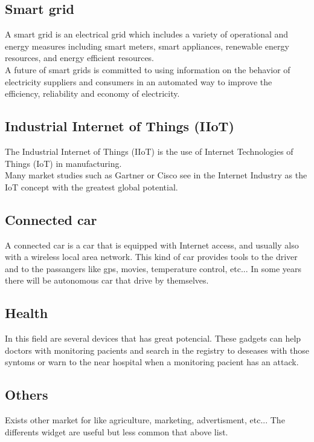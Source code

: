 \subsection{Smart grid} A smart grid is an electrical grid which includes a variety of operational and energy measures including smart meters, smart appliances, renewable energy resources, and energy efficient resources.\\
A future of smart grids is committed to using information on the behavior of electricity suppliers and consumers in an automated way to improve the efficiency, reliability and economy of electricity.

\subsection{Industrial Internet of Things (IIoT)} The Industrial Internet of Things (IIoT) is the use of Internet Technologies of Things (IoT) in manufacturing.\\ Many market studies such as Gartner or Cisco see in the Internet Industry as the IoT concept with the greatest global potential.

\subsection{Connected car} A connected car is a car that is equipped with Internet access, and usually also with a wireless local area network. This kind of car provides tools to the driver and to the passangers like gps, movies, temperature control, etc... In some years there will be autonomous car that drive by themselves.

\subsection{Health} In this field are several devices that has great potencial. These gadgets can help doctors with monitoring pacients and search in the registry to deseases with those syntoms or warn to the near hospital when a monitoring pacient has an attack.

\subsection{Others} Exists other market for \IoT like agriculture, marketing, advertisment, etc... The differents \IoT widget are useful but less common that above list.
